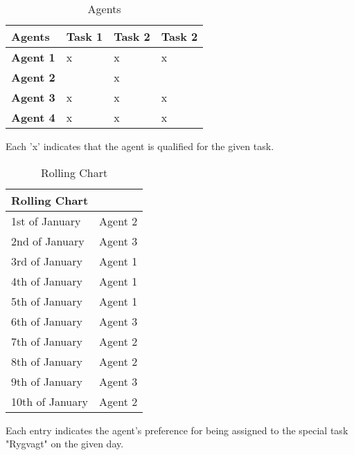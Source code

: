\begin{table}[H]
    \centering
    \begin{tabular}{|l|l|l|l|}
        \hline
        \textbf{Agents}  & \textbf{Task 1} & \textbf{Task 2} & \textbf{Task 2} \\ \hline
        \textbf{Agent 1} & x               & x               & x               \\ \hline
        \textbf{Agent 2} &                 & x               &                 \\ \hline
        \textbf{Agent 3} & x               & x               & x               \\ \hline
        \textbf{Agent 4} & x               & x               & x               \\ \hline
    \end{tabular}
    \caption{Agents}
    \small
    \raggedright
    Each 'x' indicates that the agent is qualified for the given task.
    \label{tab:Agents}
\end{table}

\begin{table}[H]
    \centering
    \begin{tabular}{|l|l|}
        \hline
        \textbf{Rolling Chart} & \\ \hline
        1st of January         & Agent 2   \\ \hline
        2nd of January         & Agent 3   \\ \hline
        3rd of January         & Agent 1   \\ \hline
        4th of January         & Agent 1   \\ \hline
        5th of January         & Agent 1   \\ \hline
        6th of January         & Agent 3   \\ \hline
        7th of January         & Agent 2   \\ \hline
        8th of January         & Agent 2   \\ \hline
        9th of January         & Agent 3   \\ \hline
        10th of January        & Agent 2   \\ \hline
    \end{tabular}
    \caption{Rolling Chart}
    \small
    \raggedright
    Each entry indicates the agent's preference for being assigned to the special task "Rygvagt" on the given day.
    \label{tab:Rolling-Chart}
\end{table}

